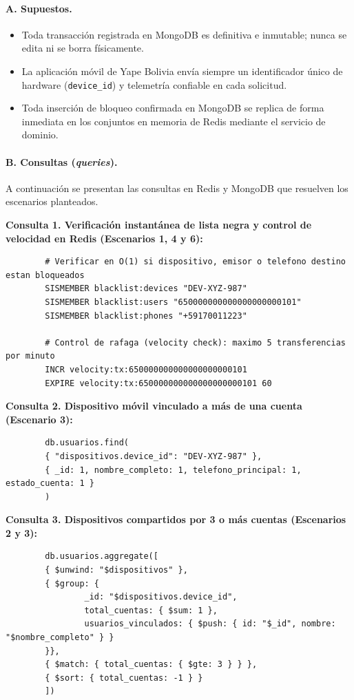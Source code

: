 \documentclass[11pt,a4paper]{article}
\begin{document}
	\paragraph{A. Supuestos.}
	\begin{itemize}[leftmargin=2em]
		\item Toda transacción registrada en MongoDB es definitiva e inmutable; nunca se edita ni se borra físicamente.
		\item La aplicación móvil de Yape Bolivia envía siempre un identificador único de hardware (\texttt{device\_id}) y telemetría confiable en cada solicitud.
		\item Toda inserción de bloqueo confirmada en MongoDB se replica de forma inmediata en los conjuntos en memoria de Redis mediante el servicio de dominio.
	\end{itemize}
	
	\paragraph{B. Consultas (\textit{queries}).}
	A continuación se presentan las consultas en Redis y MongoDB que resuelven los escenarios planteados.
	
	\textbf{Consulta 1. Verificación instantánea de lista negra y control de velocidad en Redis (Escenarios 1, 4 y 6):}
	\begin{lstlisting}
		# Verificar en O(1) si dispositivo, emisor o telefono destino estan bloqueados
		SISMEMBER blacklist:devices "DEV-XYZ-987"
		SISMEMBER blacklist:users "650000000000000000000101"
		SISMEMBER blacklist:phones "+59170011223"
		
		# Control de rafaga (velocity check): maximo 5 transferencias por minuto
		INCR velocity:tx:650000000000000000000101
		EXPIRE velocity:tx:650000000000000000000101 60
	\end{lstlisting}
	
	\textbf{Consulta 2. Dispositivo móvil vinculado a más de una cuenta (Escenario 3):}
	\begin{lstlisting}
		db.usuarios.find(
		{ "dispositivos.device_id": "DEV-XYZ-987" },
		{ _id: 1, nombre_completo: 1, telefono_principal: 1, estado_cuenta: 1 }
		)
	\end{lstlisting}
	
	\textbf{Consulta 3. Dispositivos compartidos por 3 o más cuentas (Escenarios 2 y 3):}
	\begin{lstlisting}
		db.usuarios.aggregate([
		{ $unwind: "$dispositivos" },
		{ $group: {
				_id: "$dispositivos.device_id",
				total_cuentas: { $sum: 1 },
				usuarios_vinculados: { $push: { id: "$_id", nombre: "$nombre_completo" } }
		}},
		{ $match: { total_cuentas: { $gte: 3 } } },
		{ $sort: { total_cuentas: -1 } }
		])
	\end{lstlisting}
	
\end{document}
